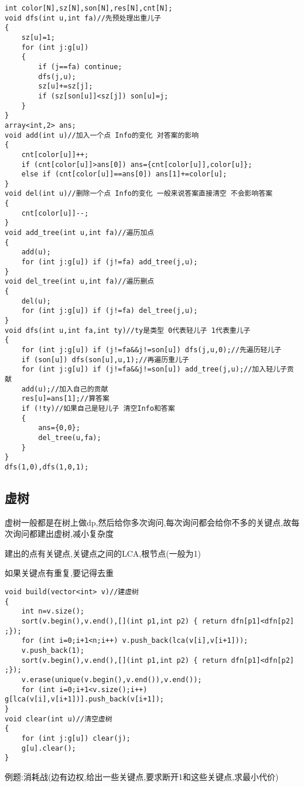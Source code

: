 \documentclass[a4paper]{ctexart}
\begin{document}
\begin{lstlisting}
int color[N],sz[N],son[N],res[N],cnt[N];
void dfs(int u,int fa)//先预处理出重儿子
{
    sz[u]=1;
    for (int j:g[u])
    {
        if (j==fa) continue;
        dfs(j,u);
        sz[u]+=sz[j];
        if (sz[son[u]]<sz[j]) son[u]=j;
    }
}
array<int,2> ans;
void add(int u)//加入一个点 Info的变化 对答案的影响
{
    cnt[color[u]]++;
    if (cnt[color[u]]>ans[0]) ans={cnt[color[u]],color[u]};
    else if (cnt[color[u]]==ans[0]) ans[1]+=color[u];
}
void del(int u)//删除一个点 Info的变化 一般来说答案直接清空 不会影响答案
{
    cnt[color[u]]--;
}
void add_tree(int u,int fa)//遍历加点
{
    add(u);
    for (int j:g[u]) if (j!=fa) add_tree(j,u);
}
void del_tree(int u,int fa)//遍历删点
{
    del(u);
    for (int j:g[u]) if (j!=fa) del_tree(j,u);
}
void dfs(int u,int fa,int ty)//ty是类型 0代表轻儿子 1代表重儿子
{
    for (int j:g[u]) if (j!=fa&&j!=son[u]) dfs(j,u,0);//先遍历轻儿子
    if (son[u]) dfs(son[u],u,1);//再遍历重儿子
    for (int j:g[u]) if (j!=fa&&j!=son[u]) add_tree(j,u);//加入轻儿子贡献
    add(u);//加入自己的贡献
    res[u]=ans[1];//算答案
    if (!ty)//如果自己是轻儿子 清空Info和答案
    {
        ans={0,0};
        del_tree(u,fa);
    }
}
dfs(1,0),dfs(1,0,1);
\end{lstlisting}
\subsection{虚树}

虚树一般都是在树上做dp,然后给你多次询问,每次询问都会给你不多的关键点,故每次询问都建出虚树,减小复杂度

建出的点有关键点,关键点之间的LCA,根节点(一般为1)

如果关键点有重复,要记得去重

\begin{lstlisting}
void build(vector<int> v)//建虚树
{
    int n=v.size();
    sort(v.begin(),v.end(),[](int p1,int p2) { return dfn[p1]<dfn[p2] ;});
    for (int i=0;i+1<n;i++) v.push_back(lca(v[i],v[i+1]));
    v.push_back(1);
    sort(v.begin(),v.end(),[](int p1,int p2) { return dfn[p1]<dfn[p2] ;});
    v.erase(unique(v.begin(),v.end()),v.end());
    for (int i=0;i+1<v.size();i++) g[lca(v[i],v[i+1])].push_back(v[i+1]);
}
void clear(int u)//清空虚树
{
    for (int j:g[u]) clear(j);
    g[u].clear();
}
\end{lstlisting}


例题:消耗战(边有边权,给出一些关键点,要求断开1和这些关键点,求最小代价)
\end{document}

